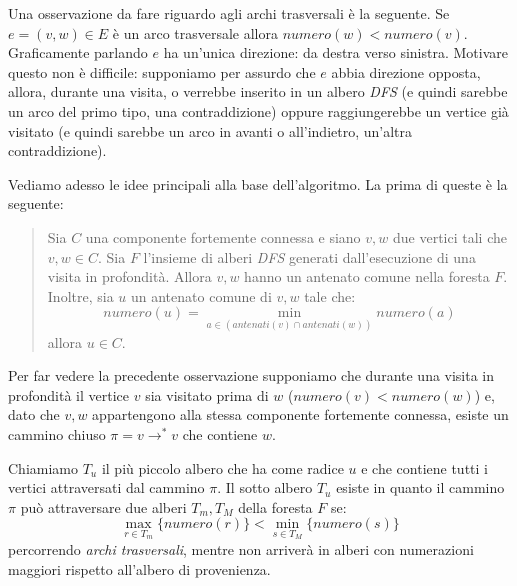 Una osservazione da fare riguardo agli archi trasversali \`e la
seguente. Se $e = (v, w) \in E$ \`e un arco trasversale allora
$numero(w) < numero(v)$. Graficamente parlando $e$ ha un'unica
direzione: da destra verso sinistra. Motivare questo non \`e
difficile: supponiamo per assurdo che $e$ abbia direzione opposta,
allora, durante una visita, o verrebbe inserito in un albero
\emph{DFS} (e quindi sarebbe un arco del primo tipo, una
contraddizione) oppure raggiungerebbe un vertice gi\`a visitato (e
quindi sarebbe un arco in avanti o all'indietro, un'altra
contraddizione).

Vediamo adesso le idee principali alla base dell'algoritmo. La prima
di queste \`e la seguente:
\begin{quotation}
  Sia $C$ una componente fortemente connessa e siano $v, w$ due
  vertici tali che $v, w \in C$. Sia $F$ l'insieme di alberi
  \emph{DFS} generati dall'esecuzione di una visita in
  profondit\`a. Allora $v, w$ hanno un antenato comune nella foresta
  $F$. Inoltre, sia $u$ un antenato comune di $v, w$ tale che:
  \begin{displaymath}
    numero(u) = \min_{a \in (antenati(v)\cap antenati(w))}{numero(a)}
  \end{displaymath}
  allora $u \in C$.
\end{quotation}
Per far vedere la precedente osservazione supponiamo che durante una
visita in profondit\`a il vertice $v$ sia visitato prima di $w$
($numero(v) < numero(w)$) e, dato che $v,w$ appartengono alla stessa
componente fortemente connessa, esiste un cammino chiuso $\pi = v
\rightarrow^{*} v$ che contiene $w$. 

Chiamiamo $T_{u}$ il pi\`u piccolo albero che ha come radice $u$ e che
contiene tutti i vertici attraversati dal cammino $\pi$. Il sotto
albero $T_{u}$ esiste in quanto il cammino $\pi$ pu\`o attraversare
due alberi $T_{m}, T_{M}$ della foresta $F$ se:
\begin{displaymath}
  \max_{r \in T_{m}}\{numero(r)\} < \min_{s \in T_{M}}\{numero(s)\}
\end{displaymath}
percorrendo \emph{archi trasversali}, mentre non arriver\`a in alberi
con numerazioni maggiori rispetto all'albero di provenienza.

